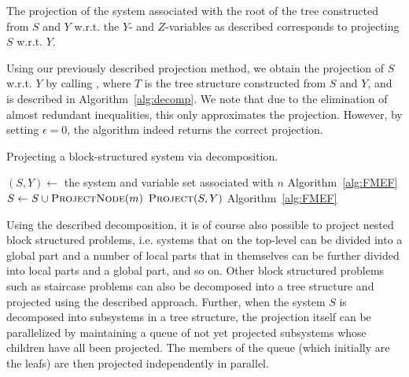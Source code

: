 \documentclass{llncs}
\begin{document}
\begin{proposition}
The projection of the system associated with the root of the tree constructed from $S$ and $Y$ w.r.t. the $Y$- and $Z$-variables as described corresponds to projecting $S$ w.r.t. $Y$.
\end{proposition}

Using our previously described projection method, we obtain the projection of $S$ w.r.t. $Y$ by calling , where $T$ is the tree structure constructed from $S$ and $Y$, and  is described in Algorithm~\ref{alg:decomp}. We note that due to the elimination of almost redundant inequalities, this only
approximates the projection. However, by setting $\epsilon = 0$, the algorithm indeed returns the correct projection.
\begin{algorithm}[tb]
\caption{{Projecting a block-structured system via decomposition.}}
\label{alg:decomp}
\begin{algorithmic}
	\State $(S,Y)\gets$ the system and variable set associated with $n$
		\State \Return {}\Comment Algorithm~\ref{alg:FMEF}
	\Else
			\State $S \gets S\cup \Call{ProjectNode}{m}$ 
		\EndFor
		\State \Return $\Call{Project}{S, Y}$ \Comment Algorithm~\ref{alg:FMEF}
	\EndIf
\EndFunction
\end{algorithmic}
\end{algorithm}

Using the described decomposition, it is of course also possible to project nested block structured problems, i.e. systems that on the top-level can be divided into a global part and a number of local parts that in themselves can be further divided into local parts and a global part, and so on. Other block structured problems such as staircase problems can also be decomposed into a tree structure and projected using the described approach. 
%
Further, when the system $S$ is decomposed into subsystems in a tree structure, the projection itself can be parallelized by maintaining a queue of not yet projected subsystems whose children have all been projected. The members of the queue (which initially are the leafs) are then projected independently in parallel. %

\end{document}
